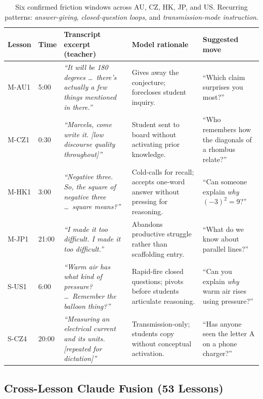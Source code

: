 \documentclass[10pt,twocolumn,letterpaper]{article}
\begin{document}
\begin{table}[!t]
\scriptsize\centering
\renewcommand{\arraystretch}{0.94}
\setlength{\tabcolsep}{3pt}
\begin{tabular}{p{0.85cm} p{0.5cm} p{4.5cm} p{5.0cm} p{3.7cm}}
\toprule
\textbf{Lesson} & \textbf{Time} & \textbf{Transcript excerpt (teacher)} &
  \textbf{Model rationale} & \textbf{Suggested move} \\
\midrule
M-AU1 & 5:00 &
  \textit{``It will be 180 degrees \ldots\ there's actually a few things mentioned in there.''} &
  Gives away the conjecture; forecloses student inquiry. &
  ``Which claim surprises you most?'' \\
\addlinespace[0pt]
M-CZ1 & 0:30 &
  \textit{``Marcela, come write it. [low discourse quality throughout]''} &
  Student sent to board without activating prior knowledge. &
  ``Who remembers how the diagonals of a rhombus relate?'' \\
\addlinespace[0pt]
M-HK1 & 3:00 &
  \textit{``Negative three. So, the square of negative three \ldots\ square means?''} &
  Cold-calls for recall; accepts one-word answer without pressing for reasoning. &
  ``Can someone explain \emph{why} $(-3)^2 = 9$?'' \\
\addlinespace[0pt]
M-JP1 & 21:00 &
  \textit{``I made it too difficult. I made it too difficult.''} &
  Abandons productive struggle rather than scaffolding entry. &
  ``What do we know about parallel lines?'' \\
\addlinespace[0pt]
S-US1 & 6:00 &
  \textit{``Warm air has what kind of pressure? \ldots\ Remember the balloon thing?''} &
  Rapid-fire closed questions; pivots before students articulate reasoning. &
  ``Can you explain \emph{why} warm air rises using pressure?'' \\
\addlinespace[0pt]
S-CZ4 & 20:00 &
  \textit{``Measuring an electrical current and its units.
  [repeated for dictation]''} &
  Transmission-only; students copy without conceptual activation. &
  ``Has anyone seen the letter A on a phone charger?'' \\

\bottomrule
\end{tabular}
\caption{Six confirmed friction windows across AU, CZ, HK, JP, and US.
Recurring patterns: \emph{answer-giving}, \emph{closed-question loops}, and
\emph{transmission-mode instruction}.}
\label{table:examples}
\end{table}

\subsection{Cross-Lesson Claude Fusion (53 Lessons)}
\end{document}
